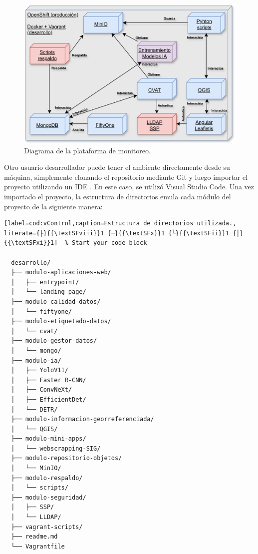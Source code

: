 \begin{figure}[htpb]
  \centering
  \includegraphics[scale=0.09]{./Figures/herramientas-plataforma.png}
  \caption{Diagrama de la plataforma de monitoreo.}
  \label{fig:infra-desarrollo}
\end{figure}

Otro usuario desarrollador puede tener el ambiente directamente desde su máquina, simplemente clonando el repositorio \citep{bruno_masoller_brunomaso1uba-ceia_nodate} mediante Git y luego importar el proyecto utilizando un IDE \citep{wikipedia_entorno_2025}. En este caso, se utilizó Visual Studio Code. Una vez importado el proyecto, la estructura de directorios emula cada módulo del proyecto de la siguiente manera:


%
%

%
%

\begin{lstlisting}[label=cod:vControl,caption=Estructura de directorios utilizada., literate={├}{{\textSFviii}}1 {─}{{\textSFx}}1 {└}{{\textSFii}}1 {│}{{\textSFxi}}1]  % Start your code-block

  desarrollo/
  ├── modulo-aplicaciones-web/
  │   ├── entrypoint/
  │   └── landing-page/
  ├── modulo-calidad-datos/
  │   └── fiftyone/
  ├── modulo-etiquetado-datos/
  │   └── cvat/
  ├── modulo-gestor-datos/
  │   └── mongo/
  ├── modulo-ia/
  │   ├── YoloV11/
  │   ├── Faster R-CNN/
  │   ├── ConvNeXt/
  │   ├── EfficientDet/
  │   └── DETR/
  ├── modulo-informacion-georreferenciada/
  │   └── QGIS/
  ├── modulo-mini-apps/
  │   └── webscrapping-SIG/
  ├── modulo-repositorio-objetos/
  │   └── MinIO/
  ├── modulo-respaldo/
  │   └── scripts/
  ├── modulo-seguridad/
  │   ├── SSP/
  │   └── LLDAP/
  ├── vagrant-scripts/
  ├── readme.md
  └── Vagrantfile

\end{lstlisting}

